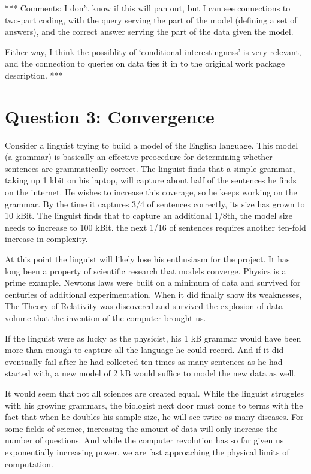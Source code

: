 \documentclass{article}
\begin{document}
*** Comments:
I don't know if this will pan out, but I can see connections to two-part coding, with the query serving the part of the model (defining a set of answers), and the correct answer serving the part of the data given the model. 

Either way, I think the possiblity of `conditional interestingness' is very relevant, and the connection to queries on data ties it in to the original work package description.
***
\section*{Question 3: Convergence}

Consider a linguist trying to build a model of the English language. This model (a grammar) is basically an effective preocedure for determining whether sentences are grammatically correct. The linguist finds that a simple grammar, taking up 1 kbit on his laptop, will capture about half of the sentences he finds on the internet. He wishes to increase this coverage, so he keeps working on the grammar. By the time it captures 3/4 of sentences correctly, its size has grown to 10 kBit. The linguist finds that to capture an additional 1/8th, the model size needs to increase to 100 kBit. the next 1/16 of sentences requires another ten-fold increase in complexity.

At this point the linguist will likely lose his enthusiasm for the project. It has long been a property of scientific research that models converge. Physics is a prime example. Newtons laws were built on a minimum of data and survived for centuries of additional experimentation. When it did finally show its weaknesses, The Theory of Relativity was discovered and survived the explosion of data-volume that the invention of the computer brought us. 

If the linguist were as lucky as the physicist, his 1 kB grammar would have been more than enough to capture all the language he could record. And if it did eventually fail after he had collected ten times as many sentences as he had started with, a new model of 2 kB would suffice to model the new data as well.

It would seem that not all sciences are created equal. While the linguist struggles with his growing grammars, the biologist next door must come to terms with the fact that when he doubles his sample size, he will see twice as many diseases. For some fields of science, increasing the amount of data will only increase the number of questions. And while the computer revolution has so far given us exponentially increasing power, we are fast approaching the physical limits of computation. 
\end{document}
